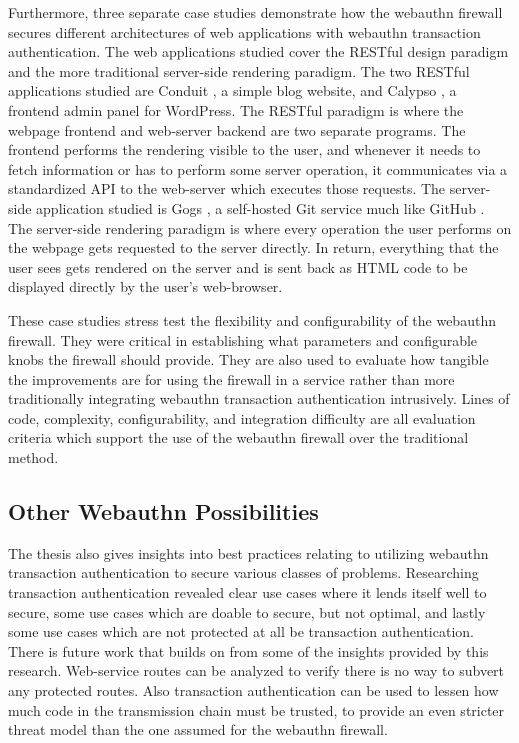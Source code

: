 Furthermore, three separate case studies demonstrate how the webauthn firewall secures different architectures of web applications with webauthn transaction authentication. The web applications studied cover the RESTful design paradigm and the more traditional server-side rendering paradigm. The two RESTful applications studied are Conduit \cite{TODO-conduit}, a simple blog website, and Calypso \cite{TODO-calypso}, a frontend admin panel for WordPress. The RESTful paradigm is where the webpage frontend and web-server backend are two separate programs. The frontend performs the rendering visible to the user, and whenever it needs to fetch information or has to perform some server operation, it communicates via a standardized API to the web-server which executes those requests. The server-side application studied is Gogs \cite{TODO-gogs}, a self-hosted Git service much like GitHub \cite{TODO-github?}. The server-side rendering paradigm is where every operation the user performs on the webpage gets requested to the server directly. In return, everything that the user sees gets rendered on the server and is sent back as HTML code to be displayed directly by the user's web-browser.

These case studies stress test the flexibility and configurability of the webauthn firewall. They were critical in establishing what parameters and configurable knobs the firewall should provide. They are also used to evaluate how tangible the improvements are for using the firewall in a service rather than more traditionally integrating webauthn transaction authentication intrusively. Lines of code, complexity, configurability, and integration difficulty are all evaluation criteria which support the use of the webauthn firewall over the traditional method.

\subsection{Other Webauthn Possibilities}

The thesis also gives insights into best practices relating to utilizing webauthn transaction authentication to secure various classes of problems. Researching transaction authentication revealed clear use cases where it lends itself well to secure, some use cases which are doable to secure, but not optimal, and lastly some use cases which are not protected at all be transaction authentication. There is future work that builds on from some of the insights provided by this research. Web-service routes can be analyzed to verify there is no way to subvert any protected routes. Also transaction authentication can be used to lessen how much code in the transmission chain must be trusted, to provide an even stricter threat model than the one assumed for the webauthn firewall. 

